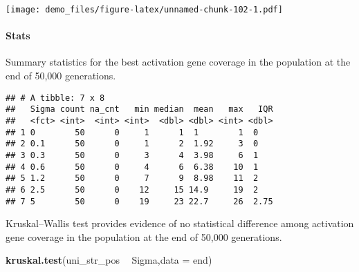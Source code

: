 \documentclass[]{book}
\newenvironment{Shaded}{\begin{snugshade}}{\end{snugshade}}
\newcommand{\DataTypeTok}[1]{\textcolor[rgb]{0.13,0.29,0.53}{#1}}
\newcommand{\KeywordTok}[1]{\textcolor[rgb]{0.13,0.29,0.53}{\textbf{#1}}}
\newcommand{\NormalTok}[1]{#1}
\newcommand{\OperatorTok}[1]{\textcolor[rgb]{0.81,0.36,0.00}{\textbf{#1}}}
\newcommand{\OtherTok}[1]{\textcolor[rgb]{0.56,0.35,0.01}{#1}}
\newcommand{\StringTok}[1]{\textcolor[rgb]{0.31,0.60,0.02}{#1}}
\let\oldparagraph\paragraph
\renewcommand{\paragraph}[1]{\oldparagraph{#1}\mbox{}}
\begin{document}
\texttt{[image: demo\_files/figure-latex/unnamed-chunk-102-1.pdf]}

\hypertarget{stats-57}{%
\paragraph{Stats}\label{stats-57}}

Summary statistics for the best activation gene coverage in the population at the end of 50,000 generations.

\begin{Shaded}
\end{Shaded}

\begin{verbatim}
## # A tibble: 7 x 8
##   Sigma count na_cnt   min median  mean   max   IQR
##   <fct> <int>  <int> <int>  <dbl> <dbl> <int> <dbl>
## 1 0        50      0     1      1  1        1  0   
## 2 0.1      50      0     1      2  1.92     3  0   
## 3 0.3      50      0     3      4  3.98     6  1   
## 4 0.6      50      0     4      6  6.38    10  1   
## 5 1.2      50      0     7      9  8.98    11  2   
## 6 2.5      50      0    12     15 14.9     19  2   
## 7 5        50      0    19     23 22.7     26  2.75
\end{verbatim}

Kruskal--Wallis test provides evidence of no statistical difference among activation gene coverage in the population at the end of 50,000 generations.

\begin{Shaded}
\begin{Highlighting}[]
\KeywordTok{kruskal.test}\NormalTok{(uni_str_pos }\OperatorTok{~}\StringTok{ }\NormalTok{Sigma,}\DataTypeTok{data =}\NormalTok{ end)}
\end{Highlighting}
\end{Shaded}
\end{document}
